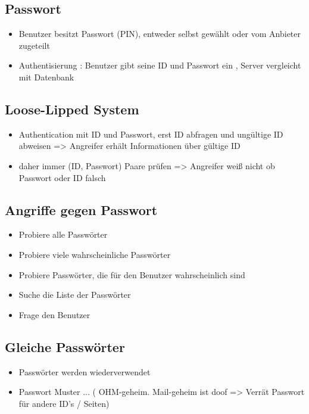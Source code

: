 \subsection*{ Passwort}
\begin{itemize}
	\item Benutzer besitzt Passwort (PIN), entweder selbst gewählt oder vom Anbieter zugeteilt
	\item Authentisierung : Benutzer gibt seine ID und Passwort ein , Server vergleicht mit Datenbank
\end{itemize}

\subsection*{Loose-Lipped System}
\begin{itemize}
	\item  Authentication mit ID und Passwort, erst ID abfragen und ungültige ID abweisen => Angreifer erhält Informationen über gültige ID
	\item daher immer (ID, Passwort) Paare prüfen => Angreifer weiß nicht ob Passwort oder ID falsch
\end{itemize}

\subsection*{ Angriffe gegen Passwort}
\begin{itemize}
	\item Probiere alle Passwörter
	\item Probiere viele wahrscheinliche Passwörter
	\item Probiere Passwörter, die für den Benutzer wahrscheinlich sind
	\item Suche die Liste der Passwörter
	\item Frage den Benutzer
	\end{itemize}

\subsection*{ Gleiche Passwörter}
\begin{itemize}
	\item Passwörter werden wiederverwendet
	\item Passwort Muster ... ( OHM-geheim. Mail-geheim ist doof => Verrät Passwort für andere ID's / Seiten)
\end{itemize}

